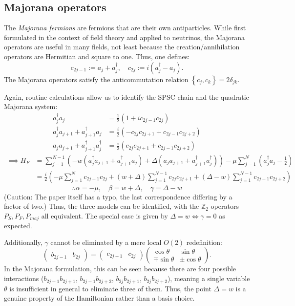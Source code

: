 \documentclass{article}
\begin{document}
\subsection{Majorana operators}
The \emph{Majorana fermions} are fermions that are their own antiparticles.
While first formulated in the context of field theory and applied to neutrinos,
the Majorana operators are useful in many fields, not least because the creation/annihilation operators
are Hermitian and square to one.
Thus, one defines:
\[
    c_{2j-1} := a_j + a_j^\dagger,\quad
    c_{2j} := i\left(a_j^\dagger - a_j\right).
\]
The Majorana operators satisfy the anticommutation relation $\left\{c_j, c_k\right\} = 2\delta_{jk}$.

Again, routine calculations allow us to identify the SPSC chain and the quadratic Majorana system:
\begin{align*}
    a_j^\dagger a_j &= \frac{1}{2}\left(1 + ic_{2j-1}c_{2j}\right)\\
    a_j^\dagger a_{j+1} + a_{j+1}^\dagger a_j &= \frac{i}{2}\left(-c_{2j}c_{2j+1} + c_{2j-1}c_{2j+2}\right) \\
    a_j a_{j+1} + a_{j+1}^\dagger a_j^\dagger &= \frac{i}{2}\left(c_{2j}c_{2j+1} + c_{2j-1}c_{2j+2}\right)
\end{align*}
\begin{align*}
    \implies H_F
    &= \sum_{j=1}^{N-1} \left(
            -w\left(a_j^\dagger a_{j+1} + a_{j+1}^\dagger a_j \right)
            +\Delta \left(a_j a_{j+1} + a_{j+1}^\dagger a_j^\dagger \right)
        \right)
        -\mu \sum_{j=1}^N \left( a_j^\dagger a_j - \frac{1}{2} \right) \\
    &= \frac{i}{2} \left(
        -\mu \sum_{j=1}^N c_{2j-1} c_{2j}
        + (w+\Delta) \sum_{j=1}^{N-1} c_{2j} c_{2j+1}
        + (\Delta - w) \sum_{j=1}^{N-1} c_{2j-1} c_{2j+2}
    \right)
\end{align*}
\[
    \therefore \alpha = -\mu,\quad
    \beta = w + \Delta,\quad
    \gamma = \Delta - w
\]
(Caution: The paper itself has a typo, the last correspondence differing by a factor of two.)
Thus, the three models can be identified, with the $\mathbb{Z}_2$ operators $P_S, P_F, P_{maj}$ all equivalent.
The special case is given by $\Delta = w \iff \gamma = 0$ as expected.

Additionally, $\gamma$ cannot be eliminated by a mere local $O(2)$ redefinition:
\[
    \begin{pmatrix}
        b_{2j-1} & b_{2j}
    \end{pmatrix} = \begin{pmatrix}
        c_{2j-1} & c_{2j}
    \end{pmatrix} \begin{pmatrix}
        \cos\theta & \sin\theta \\ \mp\sin\theta & \pm\cos\theta
    \end{pmatrix}.
\]
In the Majorana formulation, this can be seen because there are four possible interactions
($b_{2j-1}b_{2j+1}$, $b_{2j-1}b_{2j+2}$, $b_{2j}b_{2j+1}$, $b_{2j}b_{2j+2}$),
meaning a single variable $\theta$ is insufficient in general to eliminate three of them.
Thus, the point $\Delta = w$ is a genuine property of the Hamiltonian
rather than a basis choice.
\end{document}
